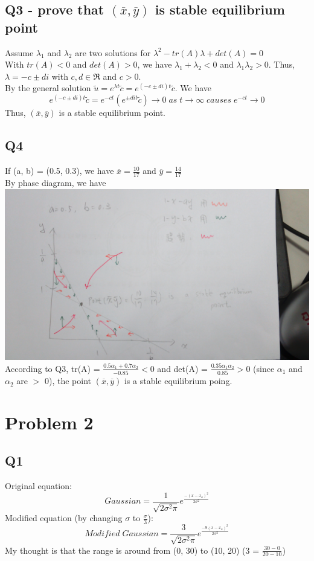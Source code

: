 \documentclass [12pt] {article}
\begin{document}
	\subsection {Q3 - prove that $(\overline{x}, \overline{y})$ is stable equilibrium point}
	Assume $\lambda_1$ and $\lambda_2$ are two solutions for $\lambda^2 - tr(A)\lambda+det(A) = 0$\\
	With $tr(A) < 0$ and $det(A) > 0$, we have $\lambda_1+\lambda_2 < 0$ and $\lambda_1\lambda_2 > 0$. Thus, $\lambda = -c \pm di$ with $c, d \in \Re$ and $c > 0.$\\
	By the general solution $\widetilde{u} = e^{\lambda t}\widetilde{c} = e^{(-c\pm di)t}\widetilde{c}$. We have
	\[e^{(-c\pm di)t}\widetilde{c} = e^{-ct}(e^{\pm dit}\widetilde{c}) \rightarrow 0 \;as \;t \rightarrow \infty \;causes \;e^{-ct}\rightarrow 0\]
	Thus, $(\overline{x}, \overline{y})$ is a stable equilibrium point.
	\subsection {Q4}
	If (a, b) = (0.5, 0.3), we have $\overline{x} = \frac{10}{17}$ and $\overline{y} = \frac{14}{17}$\\
	By phase diagram, we have\\
	\includegraphics [width=\linewidth]{fig1}
	According to Q3, tr(A) = $\frac{0.5\alpha_1+0.7\alpha_2}{-0.85} < 0$ and det(A) = $\frac{0.35\alpha_1\alpha_2}{0.85} > 0$ (since $\alpha_1$ and $\alpha_2$ are $>$ 0), the point $(\overline{x}, \overline{y})$ is a stable equilibrium poing.

	\section {Problem 2}
	\subsection {Q1}
	Original equation:
	\[Gaussian = \frac{1}{\sqrt{2\sigma^2\pi}}e^{\frac{-(x-x_o)^2}{2\sigma^2}}\]
	Modified equation (by changing $\sigma$ to $\frac{\sigma}{3}$):
	\[Modified \;Gaussian = \frac{3}{\sqrt{2\sigma^2\pi}}e^{\frac{-9(x-x_o)^2}{2\sigma^2}}\]
	My thought is that the range is around from (0, 30) to (10, 20) (3 = $\frac{30-0}{20-10}$)
\end{document}
